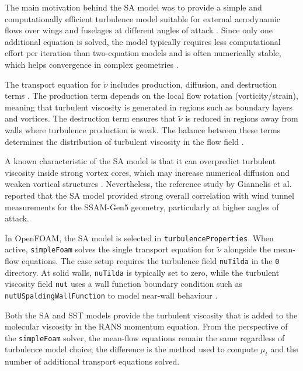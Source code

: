 The main motivation behind the SA model was to provide a simple and computationally efficient turbulence model suitable for external aerodynamic flows over wings and fuselages at different angles of attack \cite{SpalartAllmaras1992SA}. Since only one additional equation is solved, the model typically requires less computational effort per iteration than two-equation models and is often numerically stable, which helps convergence in complex geometries \cite{Wilcox2006TurbulenceModeling}.

The transport equation for $\tilde{\nu}$ includes production, diffusion, and destruction terms \cite{SpalartAllmaras1992SA,SpalartAllmaras1994SAJournal}. The production term depends on the local flow rotation (vorticity/strain), meaning that turbulent viscosity is generated in regions such as boundary layers and vortices. The destruction term ensures that $\tilde{\nu}$ is reduced in regions away from walls where turbulence production is weak. The balance between these terms determines the distribution of turbulent viscosity in the flow field \cite{Wilcox2006TurbulenceModeling}.

A known characteristic of the SA model is that it can overpredict turbulent viscosity inside strong vortex cores, which may increase numerical diffusion and weaken vortical structures \cite{Giannelis2023SSAMGen5}. Nevertheless, the reference study by Giannelis et al.~\cite{Giannelis2023SSAMGen5} reported that the SA model provided strong overall correlation with wind tunnel measurements for the SSAM-Gen5 geometry, particularly at higher angles of attack.

In OpenFOAM, the SA model is selected in \texttt{turbulenceProperties}. When active, \texttt{simpleFoam} solves the single transport equation for $\tilde{\nu}$ alongside the mean-flow equations. The case setup requires the turbulence field \texttt{nuTilda} in the \texttt{0} directory. At solid walls, \texttt{nuTilda} is typically set to zero, while the turbulent viscosity field \texttt{nut} uses a wall function boundary condition such as \texttt{nutUSpaldingWallFunction} to model near-wall behaviour \cite{VersteegMalalasekera2007CFD}.

Both the SA and SST models provide the turbulent viscosity that is added to the molecular viscosity in the RANS momentum equation. From the perspective of the \texttt{simpleFoam} solver, the mean-flow equations remain the same regardless of turbulence model choice; the difference is the method used to compute $\mu_t$ and the number of additional transport equations solved.


